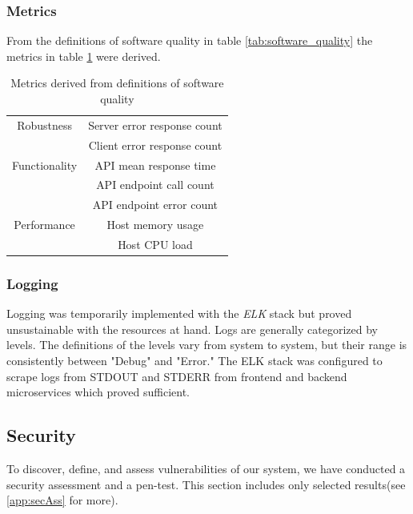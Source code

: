 \subsubsection{Metrics}
From the definitions of software quality in table \ref{tab:software_quality} the metrics in table \ref{tab:metrics} were derived.

\begin{table}[H]
    \centering
    \begin{tabular}{|c|c|} \hline
        Robustness & Server error response count \\
        & Client error response count \\ \hline
        Functionality & API mean response time  \\ 
        & API endpoint call count \\
        & API endpoint error count  \\ \hline
        Performance & Host memory usage \\
        & Host CPU load \\ \hline
    \end{tabular}
    \caption{Metrics derived from definitions of software quality}
    \label{tab:metrics}
\end{table}

\subsubsection{Logging}
Logging was temporarily implemented with the \textit{ELK} stack but proved unsustainable with the resources at hand.
Logs are generally categorized by levels. 
The definitions of the levels vary from system to system, but their range is consistently between "Debug" and "Error."
The ELK stack was configured to scrape logs from STDOUT and STDERR from frontend and backend microservices which proved sufficient.

\subsection{Security}
\label{subsec:security}
To discover, define, and assess vulnerabilities of our system, we have conducted a security assessment and a pen-test. This section includes only selected results(see \ref{app:secAss} for more).

